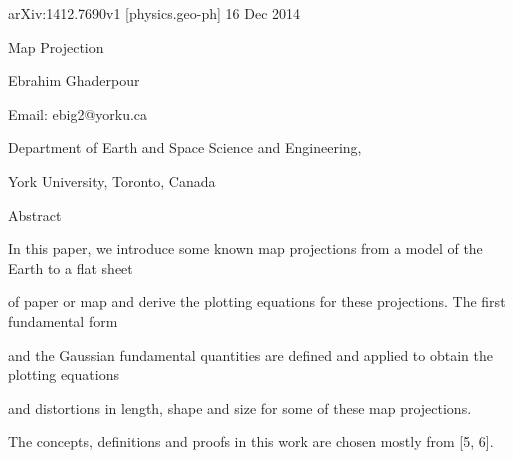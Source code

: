 \documentclass[a4paper,portrait,12pt]{article}
\begin{document}
\begin{flushleft}
arXiv:1412.7690v1 [physics.geo-ph] 16 Dec 2014
\end{flushleft}





\begin{flushleft}
Map Projection
\end{flushleft}


\begin{flushleft}
Ebrahim Ghaderpour
\end{flushleft}


\begin{flushleft}
Email: ebig2@yorku.ca
\end{flushleft}


\begin{flushleft}
Department of Earth and Space Science and Engineering,
\end{flushleft}


\begin{flushleft}
York University, Toronto, Canada
\end{flushleft}





\begin{flushleft}
Abstract
\end{flushleft}


\begin{flushleft}
In this paper, we introduce some known map projections from a model of the Earth to a flat sheet
\end{flushleft}


\begin{flushleft}
of paper or map and derive the plotting equations for these projections. The first fundamental form
\end{flushleft}


\begin{flushleft}
and the Gaussian fundamental quantities are defined and applied to obtain the plotting equations
\end{flushleft}


\begin{flushleft}
and distortions in length, shape and size for some of these map projections.
\end{flushleft}





\begin{flushleft}
The concepts, definitions and proofs in this work are chosen mostly from [5, 6].
\end{flushleft}
\end{document}
